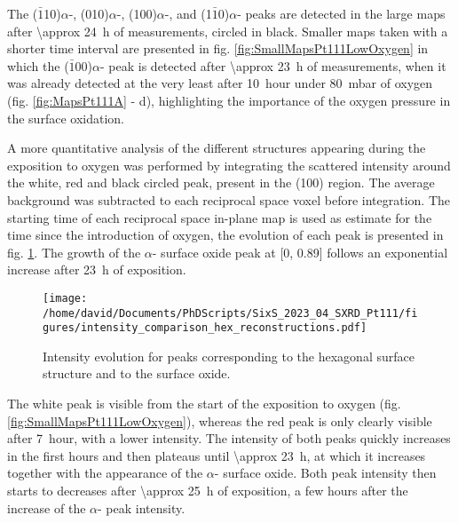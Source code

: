 The ($\bar{1}$10)$\alpha$-, (010)$\alpha$-, (100)$\alpha$-, and (1$\bar{1}$0)$\alpha$- peaks are detected in the large maps after \qty{\approx 24}{\hour} of measurements, circled in black.
Smaller maps taken with a shorter time interval are presented in fig. \ref{fig:SmallMapsPt111LowOxygen} in which the ($\bar{1}0$0)$\alpha$- peak is detected after \qty{\approx 23}{\hour} of measurements, when it was already detected at the very least after \qty{10}{hour} under \qty{80}{\milli\bar} of oxygen (fig. \ref{fig:MapsPt111A} - d), highlighting the importance of the oxygen pressure in the surface oxidation.

A more quantitative analysis of the different structures appearing during the exposition to oxygen was performed by integrating the scattered intensity around the white, red and black circled peak, present in the (100) region.
The average background was subtracted to each reciprocal space voxel before integration.
The starting time of each reciprocal space in-plane map is used as estimate for the time since the introduction of oxygen, the evolution of each peak is presented in fig. \ref{fig:HexBraggPeaks}.
The growth of the $\alpha$- surface oxide peak at [0, 0.89] follows an exponential increase after \qty{23}{\hour} of exposition.

\begin{figure}[!htb]
    \centering
    \texttt{[image: /home/david/Documents/PhDScripts/SixS\_2023\_04\_SXRD\_Pt111/figures/intensity\_comparison\_hex\_reconstructions.pdf]}
    \caption{
        Intensity evolution for peaks corresponding to the hexagonal surface structure and to the surface oxide.
    }
    \label{fig:HexBraggPeaks}
\end{figure}

The white peak is visible from the start of the exposition to oxygen (fig. \ref{fig:SmallMapsPt111LowOxygen}), whereas the red peak is only clearly visible after \qty{7}{hour}, with a lower intensity.
The intensity of both peaks quickly increases in the first hours and then plateaus until \qty{\approx 23}{\hour}, at which it increases together with the appearance of the $\alpha$- surface oxide.
Both peak intensity then starts to decreases after \qty{\approx 25}{\hour} of exposition, a few hours after the increase of the $\alpha$- peak intensity.

